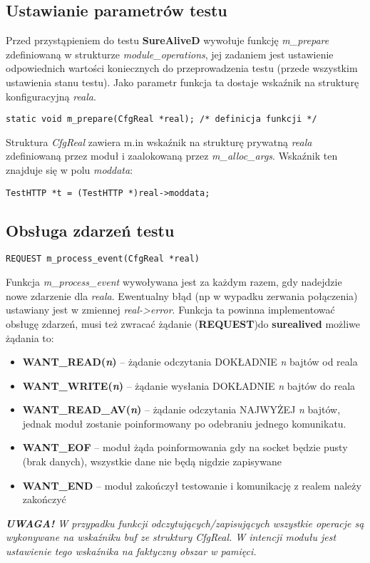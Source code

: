 \documentclass[polish,12pt]{article}
\begin{document}
\subsection{Ustawianie parametrów testu}
Przed przystąpieniem do testu \textbf{SureAliveD} wywołuje funkcję \textit{m\_prepare} zdefiniowaną
w strukturze \textit{module\_operations}, jej zadaniem jest ustawienie odpowiednich wartości koniecznych
do przeprowadzenia testu (przede wszystkim ustawienia stanu testu). Jako parametr funkcja ta dostaje
wskaźnik na strukturę konfiguracyjną \textit{reala}.
\begin{verbatim}
static void m_prepare(CfgReal *real); /* definicja funkcji */
\end{verbatim}
Struktura \textit{CfgReal} zawiera m.in wskaźnik na strukturę prywatną \textit{reala} zdefiniowaną
przez moduł i zaalokowaną przez \textit{m\_alloc\_args}. Wskaźnik ten znajduje się w polu \textit{moddata}:
\begin{verbatim}
TestHTTP *t = (TestHTTP *)real->moddata;
\end{verbatim}

\newpage

\subsection{Obsługa zdarzeń testu}
\begin{verbatim}
REQUEST m_process_event(CfgReal *real)
\end{verbatim}
Funkcja \textit{m\_process\_event} wywoływana jest za każdym razem, gdy nadejdzie nowe zdarzenie dla
\textit{reala}.
\newline
Ewentualny błąd (np w wypadku zerwania połączenia) ustawiany jest w zmiennej \textit{real->error}.
Funkcja ta powinna implementować obsługę zdarzeń, musi też zwracać żądanie (\textbf{REQUEST})do \textbf{surealived}
możliwe żądania to:
\begin{itemize}
  \item \textbf{WANT\_READ(\textit{n})} -- żądanie odczytania DOKŁADNIE \textit{n} bajtów od reala
  \item \textbf{WANT\_WRITE(\textit{n})} -- żądanie wysłania DOKŁADNIE \textit{n} bajtów do reala
  \item \textbf{WANT\_READ\_AV(\textit{n})} -- żądanie odczytania NAJWYŻEJ \textit{n} bajtów, jednak moduł
    zostanie poinformowany po odebraniu jednego komunikatu.
  \item \textbf{WANT\_EOF} -- moduł żąda poinformowania gdy na socket będzie pusty (brak danych),
    \newline wszystkie dane nie będą nigdzie zapisywane
  \item \textbf{WANT\_END} -- moduł zakończył testowanie i komunikację z realem należy zakończyć
\end{itemize}
\textit{\textbf{UWAGA!} W przypadku funkcji odczytujących/zapisujących wszystkie operacje
są wykonywane na wskaźniku \textit{buf} ze struktury CfgReal.
W intencji modułu jest ustawienie tego wskaźnika na faktyczny obszar w pamięci.}
\end{document}

